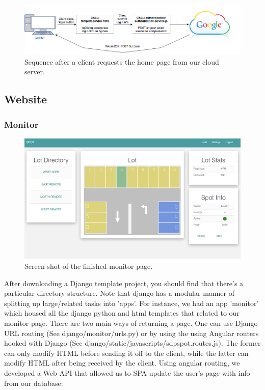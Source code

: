 \begin{figure}
\includegraphics[width=1\textwidth]{pictures/Client_angRouting(2).png}
\caption{Sequence after a client requests the home page from our cloud server.}
\end{figure}

\newpage
\subsection{Website}
\subsubsection{Monitor}
\begin{figure}[htb]
\includegraphics[width=1\textwidth]{pictures/MonitorScreen.png}
\caption{Screen shot of the finished monitor page.}
\end{figure}

After downloading a Django template project, you should find that there's a particular directory structure.
Note that django has a modular manner of splitting up large/related tasks into 'apps'.
For instance, we had an app 'monitor' which housed all the django python and html templates that related to our monitor page.
There are two main ways of returning a page. One can use Django URL routing (See django/monitor/urls.py) or by using the using Angular routers hooked with Django (See django/static/javascripts/sdpspot.routes.js).
The former can only modify HTML before sending it off to the client, while the latter can modify HTML after being received by the client.
Using angular routing, we developed a Web API that allowed us to SPA-update the user's page with info from our database:


